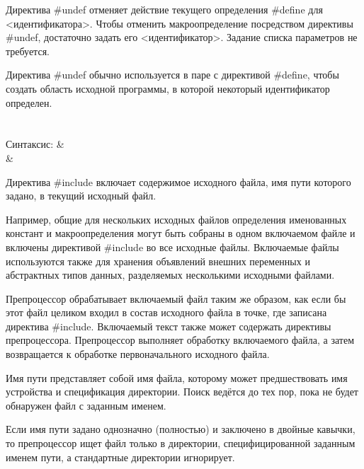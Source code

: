 Директива \#undef отменяет действие текущего определения \#define для <идентификатора>. Чтобы отменить макроопределение посредством директивы \#undef, достаточно задать его <идентификатор>. Задание списка параметров не требуется.\killoverfullbefore

Директива \#undef обычно используется в паре с директивой \#define, чтобы создать область исходной программы, в которой некоторый идентификатор определен.\killoverfullbefore

\section{}

\begin{pHeader}
    Синтаксис:      & \\
                    & \\
\end{pHeader}

Директива \#include включает содержимое исходного файла, имя пути которого задано, в текущий исходный файл.\killoverfullbefore 

Например, общие для нескольких исходных файлов определения именованных констант и макроопределения могут быть собраны в одном включаемом файле и включены директивой \#include во все исходные файлы. Включаемые файлы используются также для хранения объявлений внешних переменных и абстрактных типов данных, разделяемых несколькими исходными файлами.\killoverfullbefore

Препроцессор обрабатывает включаемый файл таким же образом, как если бы этот файл целиком входил в состав исходного файла в точке, где записана директива \#include. Включаемый текст также может содержать директивы препроцессора. Препроцессор выполняет обработку включаемого файла, а затем возвращается к обработке первоначального исходного файла.\killoverfullbefore

Имя пути представляет собой имя файла, которому может предшествовать имя устройства и спецификация директории. Поиск ведётся до тех пор, пока не будет обнаружен файл с заданным именем.\killoverfullbefore

Если имя пути задано однозначно (полностью) и заключено в двойные кавычки, то препроцессор ищет файл только в директории, специфицированной заданным именем пути, а стандартные директории игнорирует.\killoverfullbefore

